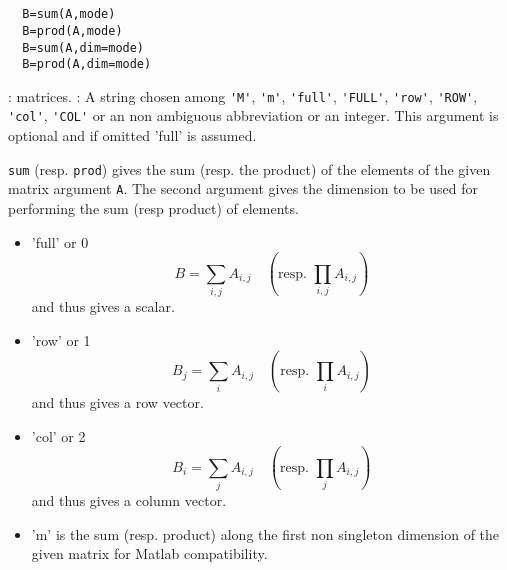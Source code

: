\begin{mandesc}
  \\ %
  \\ %
\end{mandesc}
\begin{calling_sequence}
\begin{verbatim}
  B=sum(A,mode)  
  B=prod(A,mode)  
  B=sum(A,dim=mode) 
  B=prod(A,dim=mode)  
\end{verbatim}
\end{calling_sequence}
\begin{parameters}
  \begin{varlist}
     : matrices.
     : A string chosen among \verb+'M'+, \verb+'m'+, \verb+'full'+, \verb+'FULL'+, \verb+'row'+,
    \verb+'ROW'+, \verb+'col'+, \verb+'COL'+ or an non ambiguous abbreviation or an integer. 
    This argument is optional and if omitted 'full' is assumed.
  \end{varlist}
\end{parameters}
\begin{mandescription}
  \verb+sum+ (resp. \verb+prod+) gives the sum (resp. the product) of the elements of the given matrix
  argument \verb+A+. 
  The second argument gives the dimension to be used for performing the sum (resp product) of elements.
  \begin{itemize}
    \item 'full' or 0  $$B= \sum_{i,j} A_{i,j} \quad \left(\text{resp. } \prod_{i,j} A_{i,j} \right)$$ and thus gives a scalar.
    \item 'row' or 1  $$B_j = \sum_{i} A_{i,j}\quad \left(\text{resp. } \prod_{i} A_{i,j} \right)$$ and thus gives a row vector.
    \item 'col' or 2  $$B_i = \sum_{j} A_{i,j}\quad \left(\text{resp. } \prod_{j} A_{i,j}\right)$$ and thus gives a column vector.
    \item 'm' is the sum (resp. product) along the first non singleton dimension of the given matrix 
      for Matlab compatibility. 
  \end{itemize}
\end{mandescription}
\begin{examples}
  \begin{program}
  \end{program}
\end{examples}
\begin{manseealso}
     
\end{manseealso}

